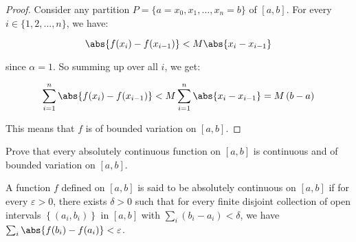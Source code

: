 \documentclass{article}
\begin{document}
\begin{proof}
    Consider any partition \( P = \{a = x_0, x_1, \ldots, x_n = b\} \) of \( [a, b] \). For every \( i \in \{1, 2, \ldots, n\} \), we have:

    \[
    \abs{f(x_i) - f(x_{i-1})} < M \abs{x_i - x_{i-1}}
    \]

    since $\alpha = 1$. So summing up over all \( i \), we get:

    \[
    \sum_{i=1}^{n} \abs{f(x_i) - f(x_{i-1})} < M \sum_{i=1}^{n} \abs{x_i - x_{i-1}} = M\left(b - a\right)
    \]

    This means that \( f \) is of bounded variation on \( [a, b] \).

\end{proof}

\clearpage

\begin{question*}[6.11]
    Prove that every absolutely continuous function on $\left[a, b\right]$ is continuous and of bounded variation on $\left[a, b\right]$.
\end{question*}

\begin{definition*}
    A function $f$ defined on $\left[a, b\right]$ is said to be absolutely continuous on $\left[a, b\right]$ if for every $\varepsilon > 0$, there exists $\delta > 0$ such that for every finite disjoint collection of open intervals $\left\{ (a_i, b_i) \right\}$ in $\left[a, b\right]$ with $\sum_i (b_i - a_i) < \delta$, we have $\sum_i \abs{f(b_i) - f(a_i)} < \varepsilon$.
\end{definition*}
\end{document}

